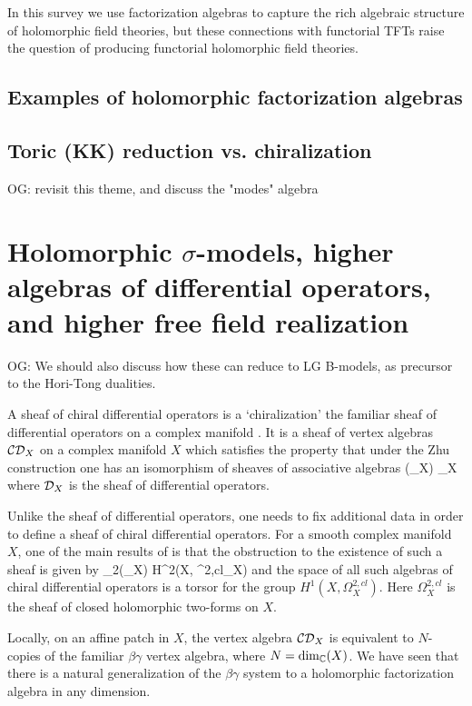 \documentclass[11pt]{amsart}
\def\CDO{{\cC\cD}}
\def\owen#1{{\textcolor{violet!65!black}{OG: {#1}}}}
\begin{document}
In this survey we use factorization algebras to capture the rich algebraic structure of holomorphic field theories,
but these connections with functorial TFTs raise the question of producing functorial holomorphic field theories.

\subsection{Examples of holomorphic factorization algebras}



\subsection{Toric (KK) reduction vs. chiralization}

\owen{revisit this theme, and discuss the "modes" algebra}

\section{Holomorphic $\sigma$-models, higher algebras of differential operators, and higher free field realization}

\owen{We should also discuss how these can reduce to LG B-models, as precursor to the Hori-Tong dualities.}

A sheaf of chiral differential operators is a `chiralization' the familiar sheaf of differential operators on a complex manifold \cite{}.
It is a sheaf of vertex algebras $\CDO_X$ on a complex manifold $X$ which satisfies the property that under the Zhu construction one has an isomorphism of sheaves of associative algebras
\beqn
{}(\CDO_X) \simeq \cD_X
\eeqn
where $\mathcal D_X$ is the sheaf of differential operators. 

Unlike the sheaf of differential operators, one needs to fix additional data in order to define a sheaf of chiral differential operators. 
For a smooth complex manifold $X$, one of the main results of \cite{} is that the obstruction to the existence of such a sheaf is given by
\beqn
\ch_2(\T_X) \in H^{2}(X, \Omega^{2,cl}_X) 
\eeqn
and the space of all such algebras of chiral differential operators is a torsor for the group $H^{1}(X, \Omega^{2,cl}_X)$.
Here $\Omega^{2,cl}_X$ is the sheaf of closed holomorphic two-forms on $X$. 

Locally, on an affine patch in $X$, the vertex algebra $\CDO_X$ is equivalent to $N$-copies of the familiar $\beta\gamma$ vertex algebra, where $N = \dim_\mathbb C(X)$. 
We have seen that there is a natural generalization of the $\beta\gamma$ system to a holomorphic factorization algebra in any dimension. 
\end{document}
